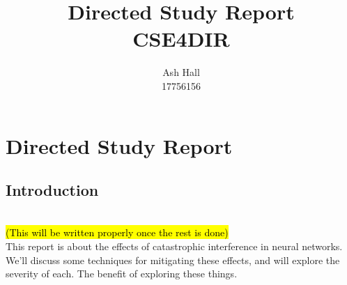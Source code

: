 \documentclass{report}
\title{Directed Study Report\\CSE4DIR}
\author{Ash Hall\\17756156}
\newcommand{\TODO}[1]{\sethlcolor{pink}\hl{\\(#1)\\}}
\begin{document}
	\maketitle
	\thispagestyle{empty}
	\newpage
	\thispagestyle{empty}
	\tableofcontents
	\newpage
	\thispagestyle{empty}
	\newpage
	
	\setcounter{chapter}{1}	
	\chapter*{Directed Study Report}

	\section{Introduction}
	\TODO{This will be written properly once the rest is done}
	This report is about the effects of catastrophic interference in neural networks. \\
	We'll discuss some techniques for mitigating these effects, and will explore the severity of each.
	The benefit of exploring these things. \\
	
	
\end{document}
